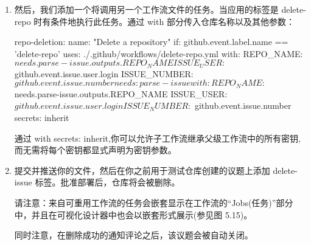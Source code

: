 \begin{enumerate}
\begin{shell}
jobs:
  parse-issue:
    runs-on: ubuntu-latest
    outputs:
      REPO_NAME: ${{ steps.repo-request.outputs.REPO_NAME }}
    steps:
      - name: Issue Forms Body Parser
        id: parse
        uses: zentered/issue-forms-body-parser@v2.0.0
      - name: Repository Request Validation
        id: repo-request
        env:
          GH_TOKEN: ${{ github.token }}
        run: |
          repo_name=$(echo '${{ steps.parse.outputs.data }}' | jq -r '.name.text')
          repo_dept=$(echo '${{ steps.parse.outputs.data }}' | jq -r '.department.text')
          repo_full_name=$repo_dept-$repo_name
          echo "REPO_NAME=$repo_full_name" >> "$GITHUB_OUTPUT"
\end{shell}

\item 
然后，我们添加一个将调用另一个工作流文件的任务。当应用的标签是 delete-repo 时有条件地执行此任务。通过 with 部分传入仓库名称以及其他参数：

\begin{shell}
repo-deletion:
  name: "Delete a repository"
  if: github.event.label.name == 'delete-repo'
  uses: ./.github/workflows/delete-repo.yml
  with:
    REPO_NAME: ${{ needs.parse-issue.outputs.REPO_NAME }}
    ISSUE_USER: ${{ github.event.issue.user.login }}
    ISSUE_NUMBER: ${{ github.event.issue.number }}
    needs: parse-issue
  with:
    REPO_NAME: ${{ needs.parse-issue.outputs.REPO_NAME }}
    ISSUE_USER: ${{ github.event.issue.user.login }}
    ISSUE_NUMBER: ${{ github.event.issue.number }}
  secrets: inherit
\end{shell}

通过 with secrets: inherit,你可以允许子工作流继承父级工作流中的所有密钥,而无需将每个密钥都显式声明为密钥参数。

\item 
提交并推送你的文件，然后在你之前用于测试仓库创建的议题上添加 delete-issue 标签。批准部署后，仓库将会被删除。

请注意：来自可重用工作流的任务会嵌套显示在工作流的“Jobs(任务)”部分中，并且在可视化设计器中也会以嵌套形式展示(参见图 5.15)。


同时注意，在删除成功的通知评论之后，该议题会被自动关闭。

\end{enumerate}


